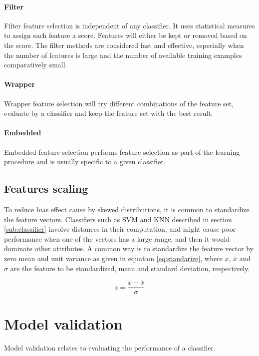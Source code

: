 \documentclass[USenglish]{ifimaster}  %
\begin{document}
	
\paragraph{Filter}
Filter feature selection is independent of any classifier. It uses statistical measures to assign each feature a score. Features will either be kept or removed based on the score. The filter methods are considered fast and effective, especially when the number of features is large and the number of available training examples comparatively small.  
	
	
\paragraph{Wrapper}
Wrapper feature selection will try different combinations of the feature set, evaluate by a classifier and keep the feature set with the best result.
	
	
\paragraph{Embedded}
Embedded feature selection performs feature selection as part of the learning procedure and is usually specific to a given classifier.

\subsection{Features scaling} \label{subsec:scaling}
To reduce bias effect cause by skewed distributions, it is common to standardize the feature vectors. Classifiers such as SVM and KNN described in section \ref{sub:classifier} involve distances in their computation, and might cause poor performance when one of the vectors has a large range, and then it would dominate other attributes. A common way is to standardize the feature vector by zero mean and unit variance as given in equation \ref{eq:standarize}, where $x$, $\bar{x}$ and $\sigma$ are the feature to be standardized, mean and standard deviation, respectively. 

\begin{equation}
z = \frac{x-\bar{x}}{\sigma}
\label{eq:standarize}
\end{equation}


	
\section{Model validation}
Model validation relates to evaluating the performance of a classifier. 
	
\end{document}
